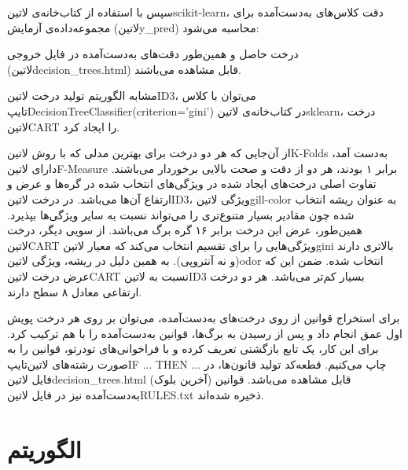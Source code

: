 \documentclass[a4paper,12pt]{article}
\begin{document}
سپس با استفاده از کتاب‌خانه‌ی ‌لاتین{scikit-learn}، دقت کلاس‌های به‌دست‌آمده برای مجموعه‌داده‌ی آزمایش (‌لاتین{y\_pred}) محاسبه می‌شود:
\begin{flushleft}
\end{flushleft}

درخت حاصل و همین‌طور دقت‌های به‌دست‌آمده در فایل خروجی (‌لاتین{decision\_trees.html}) قابل مشاهده می‌باشند.
	
	
	مشابه الگوریتم تولید درخت ‌لاتین{ID3}، می‌توان با کلاس ‌تایپ{DecisionTreeClassifier(criterion='gini')} در کتاب‌خانه‌ی ‌لاتین{sklearn}، درخت‌ ‌لاتین{CART} را ایجاد کرد.
	
	
	از آن‌جایی که هر دو درخت برای بهترین مدلی که با روش ‌لاتین{K-Folds} به‌دست آمد، دارای ‌لاتین{F-Measure} برابر ۱ بودند، هر دو از دقت و صحت بالایی برخوردار می‌باشند. تفاوت اصلی درخت‌های ایجاد شده در ویژگی‌های انتخاب شده در گره‌ها و عرض و ارتفاع آن‌ها می‌باشد. در درخت ‌لاتین{ID3}، ویژگی ‌لاتین{gill-color} به عنوان ریشه انتخاب شده چون مقادیر بسیار متنوع‌تری را می‌تواند نسبت به سایر ویژگی‌ها بپذیرد. همین‌طور، عرض این درخت برابر ۱۶ گره برگ می‌باشد. از سویی دیگر، درخت ‌لاتین{CART} ویژگی‌هایی را برای تقسیم انتخاب می‌کند که معیار ‌لاتین{gini} بالاتری دارند (و نه آنتروپی). به همین دلیل در ریشه، ویژگی ‌لاتین{odor} انتخاب شده. ضمن این که عرض درخت ‌لاتین{CART} نسبت به ‌لاتین{ID3} بسیار کم‌تر می‌باشد. هر دو درخت ارتفاعی معادل ۸ سطح دارند.
	
	
	برای استخراج قوانین از روی درخت‌های به‌دست‌آمده، می‌توان بر روی هر درخت پویش اول عمق انجام داد و پس از رسیدن به برگ‌ها، قوانین به‌دست‌آمده را با هم ترکیب کرد. برای این کار، یک تابع بازگشتی تعریف کرده و با فراخوانی‌های تودرتو، قوانین را به صورت رشته‌های ‌لاتین{‌تایپ{IF ... THEN ...}} چاپ می‌کنیم. قطعه‌کد تولید قانون‌ها، در فایل ‌لاتین{decision\_trees.html} (آخرین بلوک) قابل مشاهده می‌باشد. قوانین به‌دست‌آمده نیز در فایل ‌لاتین{RULES.txt} ذخیره شده‌اند.
	
\section{الگوریتم }
\end{document}
